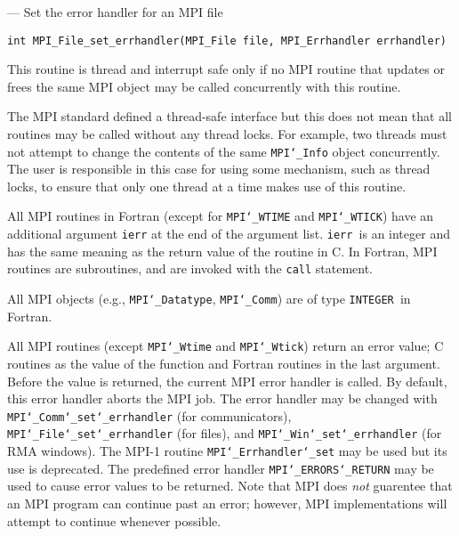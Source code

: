 \startmanpage
{}
--- Set the error handler for an MPI file 
\startvb\begin{verbatim}
int MPI_File_set_errhandler(MPI_File file, MPI_Errhandler errhandler)

\end{verbatim}
\endvb

\par
\par
{}
\par
This routine is thread and interrupt safe only if no MPI routine that
updates or frees the same MPI object may be called concurrently
with this routine.
\par
The MPI standard defined a thread-safe interface but this does not
mean that all routines may be called without any thread locks.  For
example, two threads must not attempt to change the contents of the
same {\tt MPI{\tt \char`\_}Info} object concurrently.  The user is responsible in this
case for using some mechanism, such as thread locks, to ensure that
only one thread at a time makes use of this routine.
\par
\par
{}
All MPI routines in Fortran (except for {\tt MPI{\tt \char`\_}WTIME} and {\tt MPI{\tt \char`\_}WTICK}) have
an additional argument {\tt ierr} at the end of the argument list.  {\tt ierr
}is an integer and has the same meaning as the return value of the routine
in C.  In Fortran, MPI routines are subroutines, and are invoked with the
{\tt call} statement.
\par
All MPI objects (e.g., {\tt MPI{\tt \char`\_}Datatype}, {\tt MPI{\tt \char`\_}Comm}) are of type {\tt INTEGER
}in Fortran.
\par
{}
\par
All MPI routines (except {\tt MPI{\tt \char`\_}Wtime} and {\tt MPI{\tt \char`\_}Wtick}) return an error value;
C routines as the value of the function and Fortran routines in the last
argument.  Before the value is returned, the current MPI error handler is
called.  By default, this error handler aborts the MPI job.  The error handler
may be changed with {\tt MPI{\tt \char`\_}Comm{\tt \char`\_}set{\tt \char`\_}errhandler} (for communicators),
{\tt MPI{\tt \char`\_}File{\tt \char`\_}set{\tt \char`\_}errhandler} (for files), and {\tt MPI{\tt \char`\_}Win{\tt \char`\_}set{\tt \char`\_}errhandler} (for
RMA windows).  The MPI-1 routine {\tt MPI{\tt \char`\_}Errhandler{\tt \char`\_}set} may be used but
its use is deprecated.  The predefined error handler
{\tt MPI{\tt \char`\_}ERRORS{\tt \char`\_}RETURN} may be used to cause error values to be returned.
Note that MPI does {\em not} guarentee that an MPI program can continue past
an error; however, MPI implementations will attempt to continue whenever
possible.
\par
{}
\endmanpage
